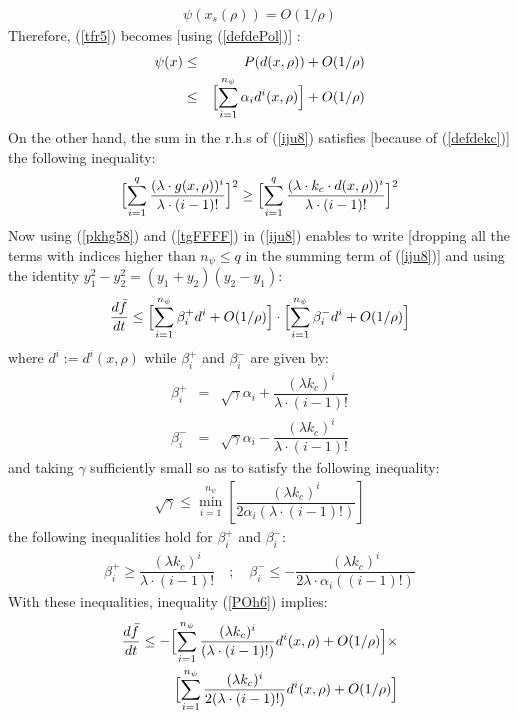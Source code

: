 \documentclass{article}
\begin{document}
\begin{eqnarray}
\psi(x_s(\rho))=O(1/\rho)
\end{eqnarray} 
Therefore, (\ref{tfr5}) becomes [using (\ref{defdePol})] :
\begin{eqnarray}
\psi(x)&\le& P(d(x,\rho))+O(1/\rho)\\
&\le& \Bigl[\sum_{i=1}^{n_\psi}\alpha_id^i(x,\rho)\Bigr]+O(1/\rho) \label{pkhg58} 
\end{eqnarray} 
On the other hand, the sum in the r.h.s of (\ref{iju8}) satisfies [because of (\ref{defdekc})] the following inequality:
\begin{eqnarray}
\Bigl[\sum_{i=1}^{q}\dfrac{(\lambda\cdot g(x,\rho))^{i}}{\lambda\cdot(i-1)!}\Bigr]^2\ge \Bigl[\sum_{i=1}^{q}\dfrac{(\lambda\cdot k_c\cdot d(x,\rho))^{i}}{\lambda\cdot(i-1)!}\Bigr]^2 \label{tgFFFF} 
\end{eqnarray} 
Now using (\ref{pkhg58})  and (\ref{tgFFFF}) in (\ref{iju8}) enables to write [dropping all the terms with indices higher than $n_\psi\le q$ in the summing term of (\ref{iju8})] and using the identity $y_1^2-y_2^2=(y_1+y_2)(y_2-y_1)$:
\begin{eqnarray}
\dfrac{d\bar f}{dt}\le \Bigl[\sum_{i=1}^{n_\psi}\beta_i^+d^i+O(1/\rho)\Bigr]\cdot \Bigl[\sum_{i=1}^{n_\psi}\beta_i^-d^i+O(1/\rho)\Bigr] \label{POh6} 
\end{eqnarray} 
where $d^i:=d^i(x,\rho)$ while $\beta_i^+$ and $\beta_i^-$ are given by:
\begin{eqnarray}
\beta_i^+&=&\sqrt{\gamma}\alpha_i+ \dfrac{(\lambda k_c)^i}{\lambda\cdot(i-1)!} \\
\beta_i^-&=&\sqrt{\gamma}\alpha_i- \dfrac{(\lambda k_c)^i}{\lambda\cdot(i-1)!}
\end{eqnarray} 
and taking $\gamma$ sufficiently small so as to satisfy the following inequality:
\begin{eqnarray}
\sqrt{\gamma}\le \min_{i=1}^{n_\psi}\left[\dfrac{(\lambda k_c)^i}{2\alpha_i(\lambda\cdot(i-1)!)}\right] \label{suffsmall} 
\end{eqnarray} 
the following inequalities hold for $\beta_i^+$ and $\beta_i^-$:
\begin{eqnarray}
\beta_i^+\ge \dfrac{(\lambda k_c)^i}{\lambda\cdot(i-1)!}\quad;\quad \beta_i^-\le -\dfrac{(\lambda k_c)^i}{2\lambda\cdot\alpha_i((i-1)!)}
\end{eqnarray} 
With these inequalities, inequality (\ref{POh6}) implies:
\begin{eqnarray}
\dfrac{d\bar f}{dt}\le -\Bigl[\sum_{i=1}^{n_\psi}\dfrac{(\lambda k_c)^i}{(\lambda\cdot(i-1)!)}d^i(x,\rho)+{\relsize{-2}O(1/\rho)}\Bigr]\times\nonumber \\ \Bigl[\sum_{i=1}^{n_\psi}\dfrac{(\lambda k_c)^i}{2(\lambda\cdot(i-1)!)}d^i(x,\rho)+{\relsize{-2}O(1/\rho)}\Bigr] \label{POh687}
\end{eqnarray} 
\end{document}
